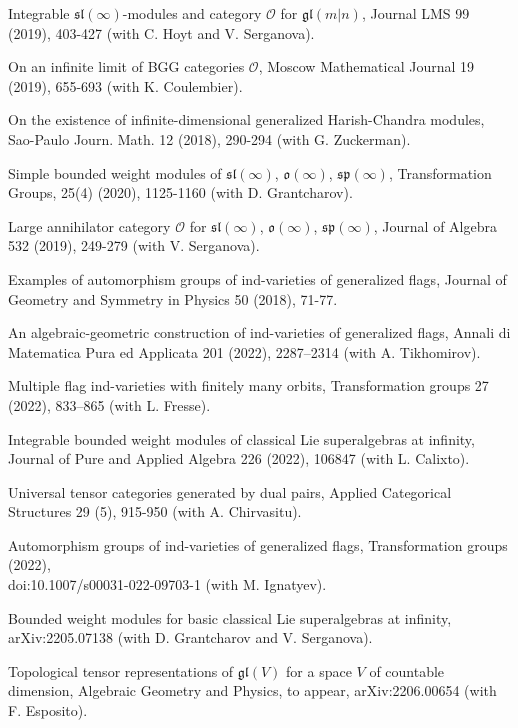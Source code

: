 \documentclass[11pt]{amsart}
\begin{document}
\myss \label{77.} Integrable $\mathfrak{sl}(\infty)$-modules and category $\mathcal O$ for $\mathfrak{gl}(m|n)$, Journal LMS 99 (2019), 403-427 (with C. Hoyt and V. Serganova).

\myss \label{78.} On an infinite	limit of BGG categories $\mathcal O$, Moscow Mathematical Journal 19 (2019), 655-693 (with K. Coulembier).

\myss \label{79.} On the existence of infinite-dimensional generalized Harish-Chandra modules, Sao-Paulo Journ. Math. 12 (2018), 290-294 (with G. Zuckerman).

\myss \label{80.} Simple bounded weight modules of $\mathfrak{sl}(\infty)$, $\mathfrak{o}(\infty)$, $\mathfrak{sp}(\infty)$, Transformation Groups, 25(4) (2020), 1125-1160 (with D. Grantcharov).

\myss \label{81.} Large annihilator category $\mathcal O$ for $\mathfrak{sl}(\infty)$, $\mathfrak{o}(\infty)$, $\mathfrak{sp}(\infty)$, Journal of Algebra 532 (2019), 249-279 (with V. Serganova).

\myss \label{82.} Examples of automorphism groups of ind-varieties of generalized flags, Journal of Geometry and Symmetry in Physics 50 (2018), 71-77.

\myss \label{83.} An algebraic-geometric construction of ind-varieties of generalized
flags, Annali di Matematica Pura ed Applicata 201 (2022), 2287–2314 (with A. Tikhomirov).

\myss \label{84.} Multiple flag ind-varieties with finitely many orbits, Transformation groups 27 (2022), 833–865
(with L. Fresse).

\myss \label{85.} Integrable bounded weight modules of classical Lie superalgebras at infinity, Journal of Pure and Applied Algebra 226 (2022), 106847 (with L. Calixto).

\myss \label{86.}  Universal tensor categories generated by dual pairs, Applied Categorical Structures 29 (5), 915-950 (with A. Chirvasitu).

\myss \label{87.} Automorphism groups of ind-varieties of generalized flags, Transformation groups (2022), \\doi:10.1007/s00031-022-09703-1 (with M. Ignatyev).

\myss \label{88.} Bounded weight modules for basic classical Lie superalgebras at infinity, \\arXiv:2205.07138 (with D. Grantcharov and V. Serganova).

\myss \label{89.} Topological tensor representations of $ \mathfrak{gl}(V) $ for a space $ V $ of countable dimension, Algebraic Geometry and Physics, to appear, arXiv:2206.00654 (with F. Esposito).
\end{document}
